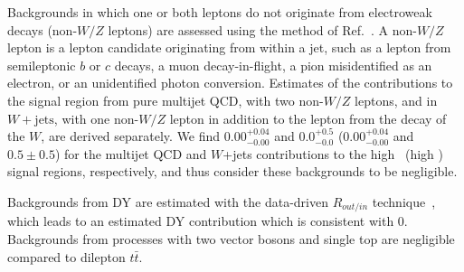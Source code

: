
Backgrounds  in  which one  or  both  leptons  do not  originate  from
electroweak decays  (non-$W/Z$ leptons) are assessed  using the method
of  Ref.~\cite{ref:top}.  A non-$W/Z$  lepton is  a lepton  candidate
originating from within a jet,  such as a lepton from semileptonic $b$
or  $c$ decays,  a muon  decay-in-flight, a  pion misidentified  as an
electron,  or an  unidentified  photon conversion.   Estimates of  the
contributions to  the signal region  from pure multijet QCD,  with two
non-$W/Z$ leptons, and in $W+\mathrm{jets}$, with one non-$W/Z$ lepton
in  addition to  the lepton  from the  decay of  the $W$,  are derived
separately. We find $0.00^{+0.04}_{-0.00}$ and $0.0^{+0.5}_{-0.0}$ 
($0.00^{+0.04}_{-0.00}$ and $0.5 \pm 0.5$)
for the  multijet QCD  and $W$+jets  contributions to the high \MET\
(high \Ht) signal regions, respectively,  and thus
consider these backgrounds to be negligible.

Backgrounds from DY are estimated with the data-driven $R_{out/in}$ technique~\cite{ref:top},
which leads to an estimated DY contribution which is consistent with 0.
Backgrounds from processes with two vector bosons and single top 
are negligible compared to dilepton $t\bar{t}$. 
